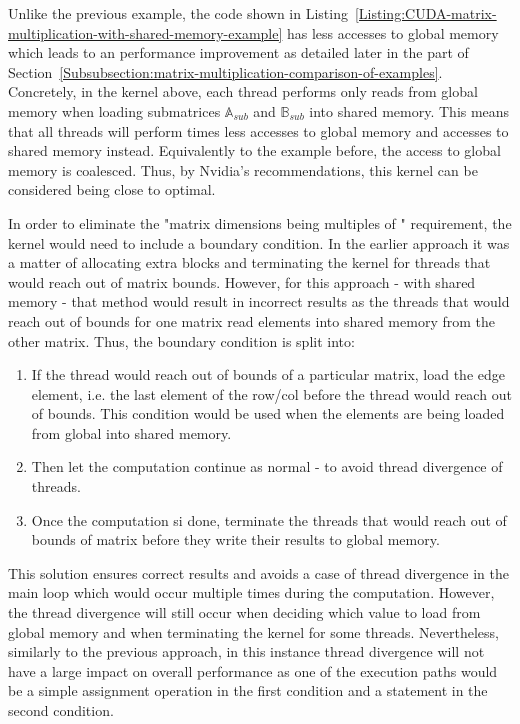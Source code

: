 Unlike the previous example, the code shown in Listing~\ref{Listing:CUDA-matrix-multiplication-with-shared-memory-example} has less accesses to global memory which leads to an performance improvement as detailed later in the \textit{} part of Section~\ref{Subsubsection:matrix-multiplication-comparison-of-examples}. Concretely, in the kernel above, each thread performs only  reads from global memory when loading submatrices $ \mathbb{A}_{sub} $ and $ \mathbb{B}_{sub} $ into shared memory. This means that all threads will perform  times less accesses to global memory and  accesses to shared memory instead. Equivalently to the example before, the access to global memory is coalesced. Thus, by Nvidia's recommendations, this kernel can be considered being close to optimal.

\par In order to eliminate the "matrix dimensions being multiples of " requirement, the kernel would need to include a boundary condition. In the earlier approach it was a matter of allocating extra blocks and terminating the kernel for threads that would reach out of matrix bounds. However, for this approach - with shared memory - that method would result in incorrect results as the threads that would reach out of bounds for one matrix read elements into shared memory from the other matrix. Thus, the boundary condition is split into:

\begin{enumerate}
	\item If the thread would reach out of bounds of a particular matrix, load the edge element, i.e. the last element of the row/col before the thread would reach out of bounds. This condition would be used when the elements are being loaded from global into shared memory.
	\item Then let the computation continue as normal - to avoid thread divergence of threads.
	\item Once the computation si done, terminate the threads that would reach out of bounds of matrix  before they write their results to global memory.
\end{enumerate}

This solution ensures correct results and avoids a case of thread divergence in the main loop which would occur multiple times during the computation. However, the thread divergence will still occur when deciding which value to load from global memory and when terminating the kernel for some threads. Nevertheless, similarly to the previous approach, in this instance thread divergence will not have a large impact on overall performance as one of the execution paths would be a simple assignment operation in the first condition and a  statement in the second condition.

